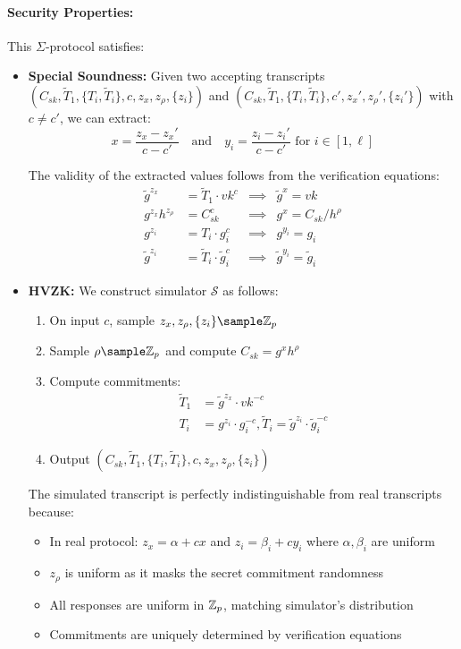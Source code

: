 \paragraph{Security Properties:}
This $\Sigma$-protocol satisfies:
\begin{itemize}
    \item \textbf{Special Soundness:} Given two accepting transcripts 
    $(C_{sk}, \tilde{T}_1, \{T_i, \tilde{T}_i\}, c, z_x, z_\rho, \{z_i\})$ and 
    $(C_{sk}, \tilde{T}_1, \{T_i, \tilde{T}_i\}, c', z_x', z_\rho', \{z_i'\})$ 
    with $c \neq c'$, we can extract:
    \[
    x = \frac{z_x - z_x'}{c - c'} \quad \text{and} \quad
    y_i = \frac{z_i - z_i'}{c - c'} \text{ for } i \in [1,\ell]
    \]
    
    The validity of the extracted values follows from the verification equations:
    \begin{align*}
        \tilde{g}^{z_x} &= \tilde{T}_1 \cdot vk^c &\implies& \tilde{g}^x = vk\\
        g^{z_x}h^{z_\rho} &= C_{sk}^c &\implies& g^x = C_{sk}/h^\rho\\
        g^{z_i} &= T_i \cdot g_i^c &\implies& g^{y_i} = g_i\\
        \tilde{g}^{z_i} &= \tilde{T}_i \cdot \tilde{g}_i^c &\implies& \tilde{g}^{y_i} = \tilde{g}_i
    \end{align*}
    
    \item \textbf{HVZK:} We construct simulator $\mathcal{S}$ as follows:
    \begin{enumerate}
        \item On input $c$, sample $z_x, z_\rho, \{z_i\} \sample \Z_p$
        \item Sample $\rho \sample \Z_p$ and compute $C_{sk} = g^x h^\rho$
        \item Compute commitments:
        \begin{align*}
            \tilde{T}_1 &= \tilde{g}^{z_x} \cdot vk^{-c}\\
            T_i &= g^{z_i} \cdot g_i^{-c}, \tilde{T}_i = \tilde{g}^{z_i} \cdot \tilde{g}_i^{-c}
        \end{align*}
        \item Output $(C_{sk}, \tilde{T}_1, \{T_i, \tilde{T}_i\}, c, z_x, z_\rho, \{z_i\})$
    \end{enumerate}
    
    The simulated transcript is perfectly indistinguishable from real transcripts because:
    \begin{itemize}
        \item In real protocol: $z_x = \alpha + cx$ and $z_i = \beta_i + cy_i$ where $\alpha, \beta_i$ are uniform
        \item $z_\rho$ is uniform as it masks the secret commitment randomness
        \item All responses are uniform in $\mathbb{Z}_p$, matching simulator's distribution
        \item Commitments are uniquely determined by verification equations
    \end{itemize}
\end{itemize}
